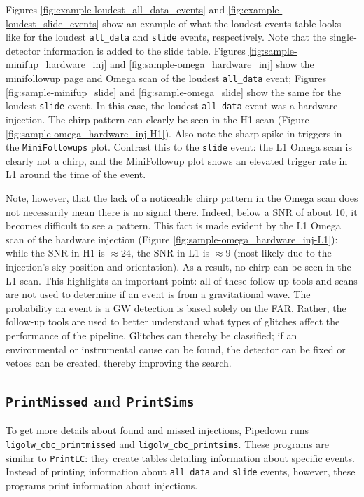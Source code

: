 Figures \ref{fig:example-loudest_all_data_events} and
\ref{fig:example-loudest_slide_events} show an example of what the
loudest-events table looks like for the loudest \verb|all_data| and
\verb|slide| events, respectively. Note that the single-detector information is
added to the slide table. Figures \ref{fig:sample-minifup_hardware_inj} and
\ref{fig:sample-omega_hardware_inj} show the minifollowup page and Omega scan
of the loudest \verb|all_data| event; Figures \ref{fig:sample-minifup_slide}
and \ref{fig:sample-omega_slide} show the same for the loudest \verb|slide|
event. In this case, the loudest \verb|all_data| event was a hardware
injection. The chirp pattern can clearly be seen in the H1 scan (Figure
\ref{fig:sample-omega_hardware_inj-H1}). Also note the sharp spike in triggers
in the \texttt{MiniFollowups} plot. Contrast this to the \verb|slide| event: the L1
Omega scan is clearly not a chirp, and the MiniFollowup plot shows an elevated
trigger rate in L1 around the time of the event.

Note, however, that the lack of a noticeable chirp pattern in the Omega scan
does not necessarily mean there is no signal there. Indeed, below a \ac{SNR} of
about 10, it becomes difficult to see a pattern. This fact is made evident by
the L1 Omega scan of the hardware injection (Figure
\ref{fig:sample-omega_hardware_inj-L1}): while the \ac{SNR} in H1 is $\approx
24$, the \ac{SNR} in L1 is $\approx 9$ (most likely due to the injection's
sky-position and orientation). As a result, no chirp can be seen in the L1
scan. This highlights an important point: all of these follow-up tools and scans
are not used to determine if an event is from a gravitational wave. The
probability an event is a \ac{GW} detection is based solely on the \ac{FAR}.
Rather, the follow-up tools are used to better understand what types of glitches
affect the performance of the pipeline. Glitches can thereby be classified; if
an environmental or instrumental cause can be found, the detector can be fixed
or vetoes can be created, thereby improving the search. 

\subsection{\texttt{PrintMissed} and \texttt{PrintSims}}
\label{sec:printmissed-printsims}

To get more details about found and missed injections, Pipedown runs \\
\verb|ligolw_cbc_printmissed| and \verb|ligolw_cbc_printsims|. These programs
are similar to \texttt{PrintLC}: they create tables detailing information about specific
events. Instead of printing information about \verb|all_data| and \verb|slide|
events, however, these programs print information about injections.

